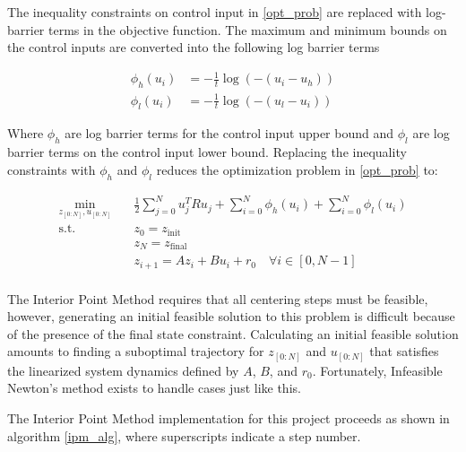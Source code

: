 \documentclass{exam}
\begin{document}
\begin{multicols*}{2}
The inequality constraints on control input in \eqref{opt_prob} are replaced with log-barrier terms in the objective function. The maximum and minimum bounds on the control inputs are converted into the following log barrier terms

\begin{equation}
    \begin{aligned}
        \phi_h(u_i) &= - \frac{1}{t} \log(-(u_i - u_h)) \\
        \phi_l(u_i) &= - \frac{1}{t} \log(-(u_l - u_i))
    \end{aligned}
\end{equation}

Where $\phi_h$ are log barrier terms for the control input upper bound and $\phi_l$ are log barrier terms on the control input lower bound. Replacing the inequality constraints with $\phi_h$ and $\phi_l$ reduces the optimization problem in \eqref{opt_prob} to:

\begin{equation}
    \label{the_actual_opt_prob}
    \begin{aligned}
        \min_{z_{[0:N]}, u_{[0:N]}} \quad& \frac{1}{2}\sum_{j=0}^N u_j^T R u_j + \sum_{i=0}^N\phi_h(u_i) + \sum_{i=0}^N \phi_l(u_i) \\
        \textrm{s.t.} \quad& z_0 = z_{\textrm{init}} \\
        \quad & z_N = z_{\textrm{final}} \\
        \quad & z_{i+1} = A z_i + B u_i + r_0 \quad \forall i \in [0, N-1] \\
    \end{aligned}
\end{equation}

The Interior Point Method requires that all centering steps must be feasible, however, generating an initial feasible solution to this problem is difficult because of the presence of the final state constraint. Calculating an initial feasible solution amounts to finding a suboptimal trajectory for $z_{[0:N]}$ and $u_{[0:N]}$ that satisfies the linearized system dynamics defined by $A$, $B$, and $r_0$. Fortunately, Infeasible Newton's method exists to handle cases just like this.

The Interior Point Method implementation for this project proceeds as shown in algorithm \ref{ipm_alg}, where superscripts indicate a step number.

\end{multicols*}
\end{document}
